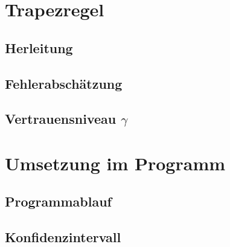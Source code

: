 \documentclass[11pt,a4paper]{scrartcl}
\begin{document}
\section{Trapezregel}
\label{sec:trapezregel}

\subsection{Herleitung}
\label{sec:herleitung}

\subsection{Fehlerabschätzung}
\label{sec:fehlerabschätzung}

\subsection{Vertrauensniveau $\gamma$}
\label{sec:vertrauensniveau}



\section{Umsetzung im Programm}
\label{sec:umsetzung_im_programm}

\subsection{Programmablauf}
\label{sec:programmablauf}

\subsection{Konfidenzintervall}
\label{sec:konfidenzintervall}


%
\printbibliography[]
\vfill
\end{document}
